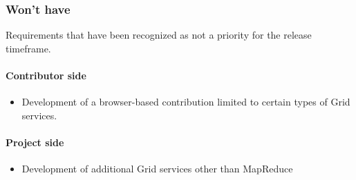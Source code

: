 \subsubsection{Won't have}
Requirements that have been recognized as not a priority for the release timeframe.
\paragraph{Contributor side}
\begin{itemize}
    \item Development of a browser-based contribution limited to certain types of Grid services.
\end{itemize}
\paragraph{Project side}
\begin{itemize}
    \item Development of additional Grid services other than MapReduce
\end{itemize}